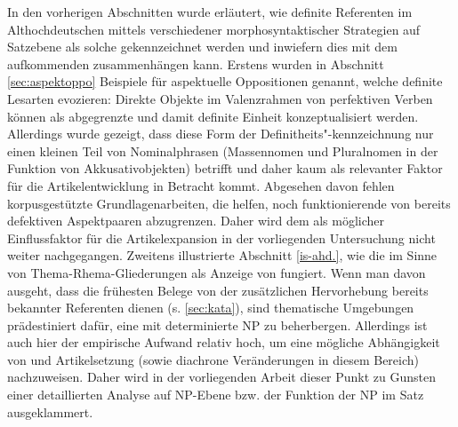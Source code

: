 
In den vorherigen Abschnitten wurde erläutert, wie definite Referenten im Althochdeutschen mittels verschiedener morphosyntaktischer Strategien auf Satzebene als solche gekennzeichnet werden und inwiefern dies mit dem aufkommenden  zusammenhängen kann. Erstens wurden in Abschnitt \ref{sec:aspektoppo} Beispiele für aspektuelle  Oppositionen genannt, welche  definite Lesarten evozieren: Direkte Objekte im Valenzrahmen von perfektiven Verben können als abgegrenzte und damit definite Einheit konzeptualisiert werden. Allerdings wurde gezeigt, dass diese Form der Definitheits"-kennzeichnung  nur einen kleinen Teil von Nominalphrasen  (Massennomen  und Pluralnomen in der Funktion von  Akkusativobjekten) betrifft und daher kaum als relevanter Faktor für die Artikelentwicklung in Betracht kommt. Abgesehen davon fehlen korpusgestützte Grundlagenarbeiten, die helfen, noch funktionierende von bereits defektiven Aspektpaaren  abzugrenzen. Daher wird dem  als möglicher Einflussfaktor für die Artikelexpansion  in der vorliegenden Untersuchung nicht weiter nachgegangen. Zweitens illustrierte Abschnitt \ref{is-ahd.}, wie die  im Sinne von Thema-Rhema-Gliederungen  als Anzeige von  fungiert. Wenn man davon ausgeht, dass die frühesten Belege von  der zusätzlichen Hervorhebung bereits bekannter Referenten dienen (s. \ref{sec:kata}), sind thematische Umgebungen prädestiniert dafür, eine mit  determinierte NP  zu beherbergen. Allerdings ist auch hier der empirische Aufwand relativ hoch, um eine mögliche Abhängigkeit von  und Artikelsetzung (sowie diachrone Veränderungen in diesem Bereich) nachzuweisen. Daher wird in der vorliegenden Arbeit  dieser Punkt zu Gunsten einer detaillierten Analyse auf NP-Ebene bzw. der Funktion der NP  im Satz ausgeklammert.

